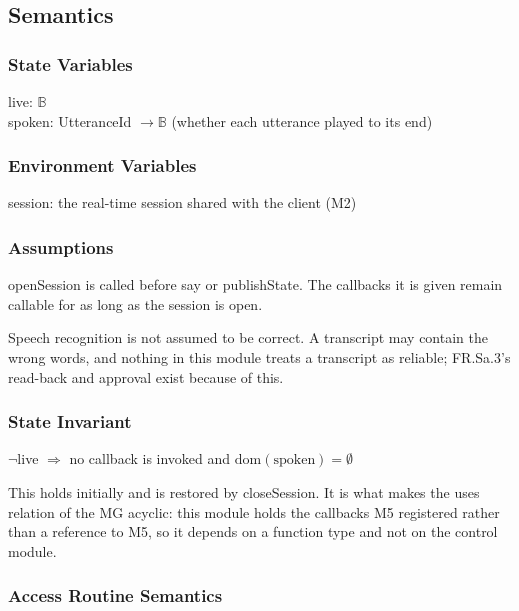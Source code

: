 \documentclass[12pt, titlepage]{article}
\newcommand{\B}{\mathbb{B}}
\begin{document}
\subsection{Semantics}

\subsubsection{State Variables}

\noindent live: $\B$\\
spoken: UtteranceId $\to \B$ (whether each utterance played to its end)

\subsubsection{Environment Variables}

session: the real-time session shared with the client (M2)

\subsubsection{Assumptions}

openSession is called before say or publishState. The callbacks it is given
remain callable for as long as the session is open.

\noindent Speech recognition is not assumed to be correct. A transcript may
contain the wrong words, and nothing in this module treats a transcript as
reliable; FR.Sa.3's read-back and approval exist because of this.

\subsubsection{State Invariant}

\noindent $\lnot$live $\Rightarrow$ no callback is invoked and
$\mathrm{dom}(\text{spoken}) = \emptyset$

\noindent This holds initially and is restored by closeSession. It is what makes
the uses relation of the MG acyclic: this module holds the callbacks M5
registered rather than a reference to M5, so it depends on a function type and
not on the control module.

\subsubsection{Access Routine Semantics}
\end{document}
